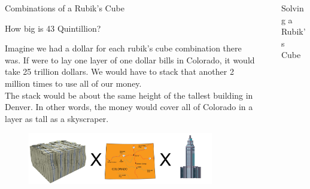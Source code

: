 \documentclass[final]{beamer}
\newlength{\sepwidth}
\newlength{\colwidth}
\newcommand{\separatorcolumn}{\begin{column}{\sepwidth}\end{column}}
\begin{document}
\begin{frame}[t]
\begin{columns}[t]
\begin{column}{\colwidth}
\begin{block}{Combinations of a Rubik's Cube}
  \end{block}

  \begin{block}{How big is 43 Quintillion?}

    \large 
    Imagine we had a dollar for each rubik's cube combination there was. If were to lay one layer of one dollar bills in
    Colorado, it would take 25 trillion dollars. We would have to stack that another 2 million times to use all of our money. \\
    The stack would be about the same height of the tallest building in Denver. In other words,
    the money would cover all of Colorado in a layer as tall as a skyscraper.
    \begin{figure}
      \centering
                    \includegraphics[width=0.9\textwidth]{logos/moneyvisual.png}
    \end{figure}

  \end{block}

\end{column}

\separatorcolumn

\begin{column}{\colwidth}

  \begin{block}{Solving a Rubik's Cube}


\end{block}
\end{column}
\end{columns}
\end{frame}
\end{document}
